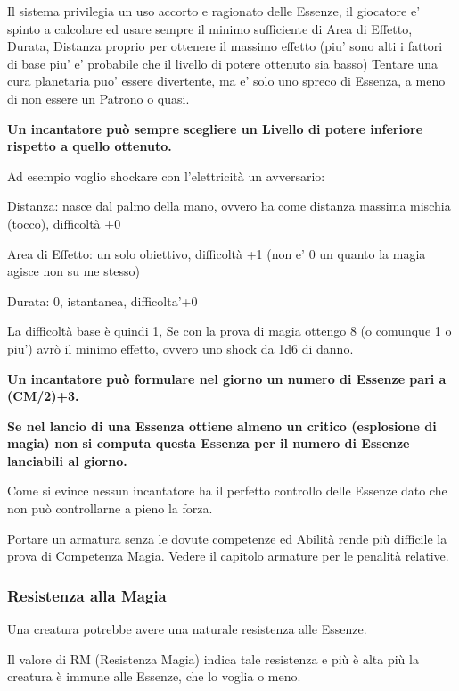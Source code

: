 \documentclass[a4paper,11pt,twoside,openany]{book}
\begin{document}
Il sistema privilegia un uso accorto e ragionato delle Essenze, il giocatore e' spinto a calcolare ed usare sempre il minimo sufficiente di Area di Effetto, Durata, Distanza proprio per ottenere il massimo effetto (piu' sono alti i fattori di base piu' e' probabile che il livello di potere ottenuto sia basso)
Tentare una cura planetaria puo' essere divertente, ma e' solo uno spreco di Essenza, a meno di non essere un Patrono o quasi.

\bigskip

\textbf{Un incantatore può sempre scegliere un Livello di potere inferiore rispetto a quello ottenuto.}

Ad esempio voglio shockare con l'elettricità un avversario:

Distanza: nasce dal palmo della mano, ovvero ha come distanza massima mischia (tocco), difficoltà +0

Area di Effetto: un solo obiettivo, difficoltà +1 (non e' 0 un quanto la magia agisce non su me stesso)

Durata: 0, istantanea, difficolta'+0

La difficoltà base è quindi 1, Se con la prova di magia ottengo 8 (o comunque 1 o piu') avrò il minimo effetto, ovvero uno shock da 1d6 di danno.

\bigskip

\textbf{Un incantatore può formulare nel giorno un numero di Essenze pari a (CM/2)+3.} 

\textbf{Se nel lancio di una Essenza ottiene almeno un critico (esplosione di magia) non si computa questa Essenza per il numero di Essenze lanciabili al giorno.}

Come si evince nessun incantatore ha il perfetto controllo delle Essenze dato che non può controllarne a pieno la forza.

Portare un armatura senza le dovute competenze ed Abilità rende più difficile la prova di Competenza Magia. Vedere il capitolo armature per le penalità relative.

\subsubsection{Resistenza alla Magia}

Una creatura potrebbe avere una naturale resistenza alle Essenze.

Il valore di RM (Resistenza Magia) indica tale resistenza e più è alta più la creatura è immune alle Essenze, che lo voglia o meno.
\end{document}
